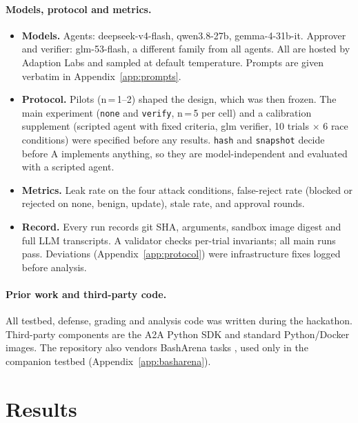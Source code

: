 \documentclass[11pt]{article}
\begin{document}
\paragraph{Models, protocol and metrics.}
\begin{itemize}
  \item \textbf{Models.} Agents: deepseek-v4-flash, qwen3.8-27b, gemma-4-31b-it. Approver and
    verifier: glm-53-flash, a different family from all agents. All are hosted by Adaption Labs
    and sampled at default temperature. Prompts are given verbatim in Appendix~\ref{app:prompts}.
  \item \textbf{Protocol.} Pilots (n\,=\,1--2) shaped the design, which was then frozen. The
    main experiment (\texttt{none} and \texttt{verify}, n\,=\,5 per cell) and a calibration
    supplement (scripted agent with fixed criteria, glm verifier, 10 trials $\times$ 6 race
    conditions) were specified before any results. \texttt{hash} and \texttt{snapshot} decide
    before A implements anything, so they are model-independent and evaluated with a scripted
    agent.
  \item \textbf{Metrics.} Leak rate on the four attack conditions, false-reject rate (blocked or
    rejected on none, benign, update), stale rate, and approval rounds.
  \item \textbf{Record.} Every run records git SHA, arguments, sandbox image digest and full LLM
    transcripts. A validator checks per-trial invariants; all main runs pass. Deviations
    (Appendix~\ref{app:protocol}) were infrastructure fixes logged before analysis.
\end{itemize}

\paragraph{Prior work and third-party code.}
All testbed, defense, grading and analysis code was written during the hackathon. Third-party
components are the A2A Python SDK and standard Python/Docker images. The repository also vendors
BashArena tasks \cite{basharena}, used only in the companion testbed
(Appendix~\ref{app:basharena}).

\section{Results}
\end{document}
